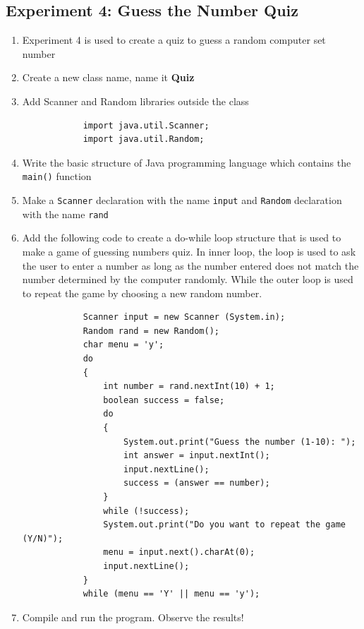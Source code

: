 \documentclass[12pt,titlepage]{article}
\begin{document}
\subsection{Experiment 4: Guess the Number Quiz}
\begin{enumerate}
    \item Experiment 4 is used to create a quiz to guess a random computer set number
    \item Create a new class name, name it \textbf{Quiz}
    \item {
        Add Scanner and Random libraries outside the class

        \begin{verbatim}
            import java.util.Scanner;
            import java.util.Random;
        \end{verbatim}
    }
    \item Write the basic structure of Java programming language which contains the \texttt{main()} function
    \item Make a \texttt{Scanner} declaration with the name \texttt{input} and \texttt{Random} declaration with the name \texttt{rand}
    \item {
        Add the following code to create a do-while loop structure that is used to make a game 
        of guessing numbers quiz. In inner loop, the loop is used to ask the user to enter a 
        number as long as the number entered does not match the number determined by 
        the computer randomly. While the outer loop is used to repeat the game by choosing 
        a new random number.

        \begin{verbatim}
            Scanner input = new Scanner (System.in);
            Random rand = new Random();
            char menu = 'y';
            do
            {
                int number = rand.nextInt(10) + 1;
                boolean success = false;
                do
                {
                    System.out.print("Guess the number (1-10): ");
                    int answer = input.nextInt();
                    input.nextLine();
                    success = (answer == number);
                }
                while (!success);
                System.out.print("Do you want to repeat the game (Y/N)");
                menu = input.next().charAt(0);
                input.nextLine();
            }
            while (menu == 'Y' || menu == 'y');
        \end{verbatim}
    }
    \pagebreak
    \item {
        Compile and run the program. Observe the results!

}
\end{enumerate}
\end{document}
